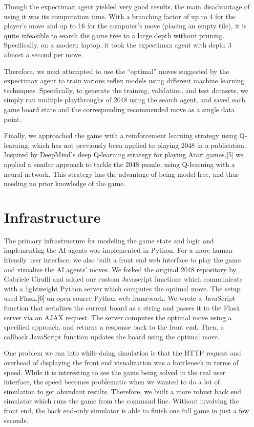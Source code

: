 \documentclass[9pt,twocolumn]{article}
\begin{document}
Though the expectimax agent yielded very good results, the main disadvantage of using it was its computation time. With a branching factor of up to 4 for the player’s move and up to 16 for the computer’s move (placing an empty tile), it is quite infeasible to search the game tree to a large depth without pruning. Specifically, on a modern laptop, it took the expectimax agent with depth 3 almost a second per move.

Therefore, we next attempted to use the “optimal” moves suggested by the expectimax agent to train various reflex models using different machine learning techniques. Specifically, to generate the training, validation, and test datasets, we simply ran multiple playthroughs of 2048 using the search agent, and saved each game board state and the corresponding recommended move as a single data point.

Finally, we approached the game with a reinforcement learning strategy using Q-learning, which has not previously been applied to playing 2048 in a publication. Inspired by DeepMind's deep Q-learning strategy for playing Atari games,[5] we applied a similar approach to tackle the 2048 puzzle, using Q-learning with a neural network. This strategy has the advantage of being model-free, and thus needing no prior knowledge of the game.

\section{Infrastructure}

The primary infrastructure for modeling the game state and logic and implementing the AI agents was implemented in Python. For a more human-friendly user interface, we also built a front end web interface to play the game and visualize the AI agents' moves. We forked the original 2048 repository by Gabriele Cirulli and added our custom Javascript functions which communicate with a lightweight Python server which computes the optimal move. The setup used Flask,[6] an open source Python web framework. We wrote a JavaScript function that serializes the current board as a string and passes it to the Flask server via an AJAX request. The server computes the optimal move using a specified approach, and returns a response back to the front end. Then, a callback JavaScript function updates the board using the optimal move.

One problem we ran into while doing simulation is that the HTTP request and overhead of displaying the front end visualization was a bottleneck in terms of speed. While it is interesting to see the game being solved in the real user interface, the speed becomes problematic when we wanted to do a lot of simulation to get abundant results. Therefore, we built a more robust back end simulator which runs the game from the command line. Without involving the front end, the back end-only simulator is able to finish one full game in just a few seconds.
\end{document}
